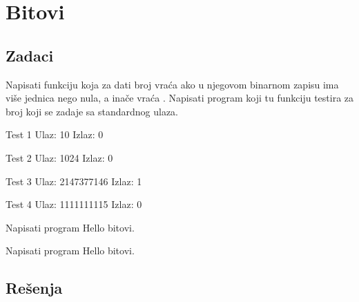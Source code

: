 
\chapter{Bitovi}

\section{Zadaci}



\begin{Exercise}[label=201]
Napisati funkciju  koja za dati broj  vraća  ako u njegovom binarnom zapisu ima više jednica nego nula, a inače vraća .  Napisati program koji tu funkciju testira za broj koji se zadaje sa standardnog ulaza.

\begin{minitest}
\begin{test}{Test 1}
Ulaz:   10
Izlaz:  0 
\end{test}
\end{minitest}
\begin{minitest}
\begin{test}{Test 2}
Ulaz:   1024
Izlaz:  0 
\end{test}
\end{minitest}
\begin{minitest}
\begin{test}{Test 3}
Ulaz:   2147377146
Izlaz:  1 
\end{test}
\end{minitest}

\begin{minitest}
\begin{test}{Test 4}
Ulaz:   1111111115
Izlaz:  0 
\end{test}
\end{minitest}


\end{Exercise}
\begin{Answer}[ref=201]
\end{Answer}

\begin{Exercise}[label=202]
  Napisati program Hello bitovi.
\end{Exercise}
\begin{Answer}[ref=202]
\end{Answer}


\begin{Exercise}[label=203]
  Napisati program Hello bitovi.
\end{Exercise}
\begin{Answer}[ref=203]
\end{Answer}



\section{Rešenja}
\shipoutAnswer
